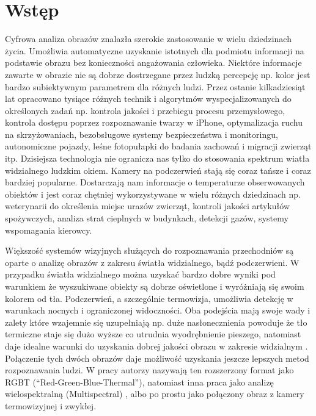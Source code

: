 \chapter{Wstęp}
\label{cha:wstep}

Cyfrowa analiza obrazów znalazła szerokie zastosowanie w wielu dziedzinach życia. Umożliwia automatyczne uzyskanie istotnych dla podmiotu informacji na podstawie obrazu bez konieczności angażowania człowieka. Niektóre informacje zawarte w obrazie nie są dobrze dostrzegane przez ludzką percepcję np. kolor jest bardzo subiektywnym parametrem dla różnych ludzi. Przez ostanie kilkadziesiąt lat opracowano tysiące różnych technik i algorytmów wyspecjalizowanych do określonych zadań np. kontrola jakości i przebiegu procesu przemysłowego, kontrola dostępu poprzez rozpoznawanie twarzy w iPhone, optymalizacja ruchu na skrzyżowaniach, bezobsługowe systemy bezpieczeństwa i monitoringu, autonomiczne pojazdy, leśne fotopułapki do badania zachowań i migracji zwierząt itp. Dzisiejsza technologia nie ogranicza nas tylko do stosowania spektrum wiatła widzialnego ludzkim okiem. Kamery na podczerwień stają się coraz tańsze i coraz bardziej popularne. Dostarczają nam informacje o temperaturze obserwowanych obiektów i jest coraz chętniej wykorzystywane w wielu różnych dziedzinach np. weterynarii do określenia miejsc urazów zwierząt, kontroli jakości artykułów spożywczych, analiza strat cieplnych w budynkach, detekcji gazów, systemy wspomagania kierowcy\cite{gade2014thermal}. 

Większość systemów wizyjnych służących do rozpoznawania przechodniów są oparte o analizę obrazów z zakresu światła widzialnego, bądź podczerwieni. W przypadku światła widzialnego można uzyskać bardzo dobre wyniki pod warunkiem że wyszukiwane obiekty są dobrze oświetlone i wyróżniają się swoim kolorem od tła. Podczerwień, a szczególnie termowizja, umożliwia detekcję w warunkach nocnych i ograniczonej widoczności. Oba podejścia mają swoje wady i zalety które wzajemnie się uzupełniają np. duże nasłonecznienia powoduje że tło termiczne staje się dużo wyższe co utrudnia wyodrębnienie pieszego, natomiast daje idealne warunki do uzyskania dobrej jakości obrazu w zakresie widzialnym \cite{lee2015robust}. Połączenie tych dwóch obrazów daje możliwość uzyskania jeszcze lepszych metod rozpoznawania ludzi. W pracy \cite{st2007combination} autorzy nazywają ten rozszerzony format jako RGBT (“Red-Green-Blue-Thermal”), natomiast inna praca jako analizę wielospektralną (Multispectral) \cite{hwang2015multispectral}, albo po prostu jako połączony obraz z kamery termowizyjnej i zwykłej\cite{lee2015robust}. 

